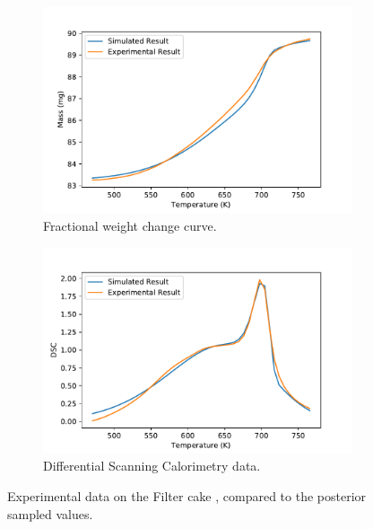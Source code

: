 \begin{figure}[h!]
\centering
\begin{subfigure}{.5\textwidth}
  \centering
  \includegraphics[width=\linewidth]{figures/bayesian/EXP_Q/FWC.pdf}  
  \caption{Fractional weight change curve.}
  \label{fig:exp_fwc_comp}
\end{subfigure}%
\begin{subfigure}{.5\textwidth}
  \centering
  \includegraphics[width=\linewidth]{figures/bayesian/EXP_Q/DSC.pdf}
  \caption{Differential Scanning Calorimetry data.}
  \label{fig:exp_DSC_comp}
\end{subfigure}
\label{fig:EXP_data_comp}
\caption{Experimental data on the Filter cake \cite{Ray19}, compared to the posterior sampled values.}
\end{figure}

